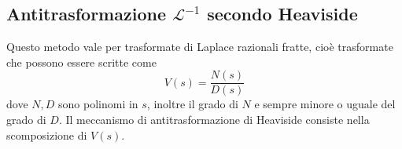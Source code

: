 \subsection{Antitrasformazione $\mathcal{L^{-1}}$ secondo Heaviside}
Questo metodo vale per trasformate di Laplace razionali fratte, cioè trasformate che possono essere scritte come
\[
    V(s) = \frac{N(s)}{D(s)}
\] dove $N, D$ sono polinomi in $s$, inoltre il grado di $N$ e sempre minore o uguale del grado di $D$.\newline
\newline
Il meccanismo di antitrasformazione di Heaviside consiste nella scomposizione di $V(s)$.